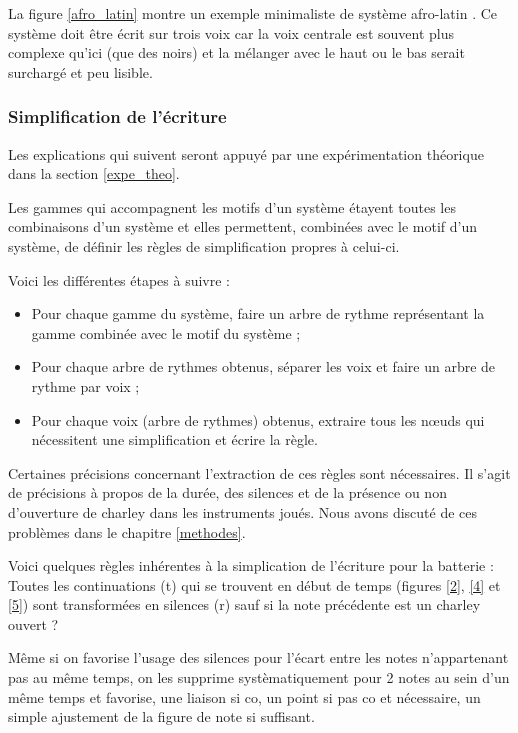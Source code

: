 La figure \ref{afro_latin} montre un exemple minimaliste de système afro-latin \cite{system_drums}. 
Ce système doit être écrit sur trois voix car la voix centrale est souvent plus complexe qu’ici (que des noirs) et la mélanger avec le haut ou le bas serait surchargé et peu lisible.

\subsubsection{Simplification de l’écriture}
Les explications qui suivent seront appuyé par une expérimentation théorique 
dans la section \ref{expe_theo}.

Les gammes qui accompagnent les motifs d’un système étayent toutes les combinaisons d’un système et elles permettent, combinées avec le motif d’un système, de définir les règles de simplification propres à celui-ci.

Voici les différentes étapes à suivre :
\begin{itemize}
	\item Pour chaque gamme du système, faire un arbre de rythme représentant la gamme combinée avec le motif du système ;
	\item Pour chaque arbre de rythmes obtenus, séparer les voix et faire un arbre de rythme par voix ;
	\item Pour chaque voix (arbre de rythmes) obtenus, extraire tous les nœuds qui nécessitent une simplification et écrire la règle.
\end{itemize}

Certaines précisions concernant l’extraction de ces règles sont nécessaires. 
Il s’agit de précisions à propos de la durée, des silences et de la présence ou non d’ouverture de charley dans les instruments joués. 
Nous avons discuté de ces problèmes dans le chapitre \ref{methodes}.

Voici quelques règles inhérentes à la simplication de l’écriture pour la batterie :
Toutes les continuations (t) qui se trouvent en début de temps 
(figures \ref{2}, \ref{4} et \ref{5}) sont transformées en silences (r) sauf si la note précédente est un charley ouvert ?

Même si on favorise l’usage des silences pour l’écart entre les notes n’appartenant pas au même temps, on les supprime systèmatiquement pour 2 notes au sein d’un même temps et favorise, une liaison si co, un point si pas co et nécessaire, un simple ajustement de la figure de note si suffisant.


